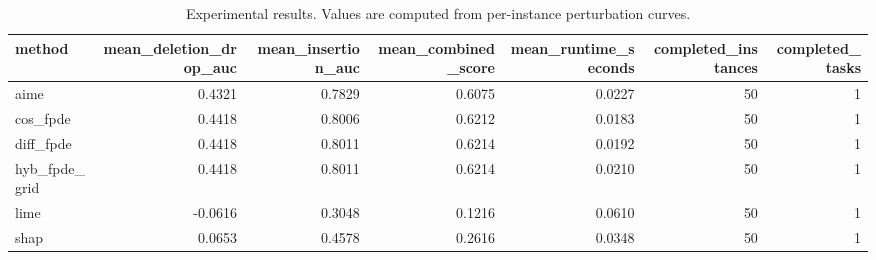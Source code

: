 \begin{table}[t]
\caption{Experimental results. Values are computed from per-instance perturbation curves.}
\label{tab:main_results_computed}
\centering
\begin{tabular}{lrrrrrr}
\toprule
method & mean\_deletion\_drop\_auc & mean\_insertion\_auc & mean\_combined\_score & mean\_runtime\_seconds & completed\_instances & completed\_tasks \\
\midrule
aime & 0.4321 & 0.7829 & 0.6075 & 0.0227 & 50 & 1 \\
cos\_fpde & 0.4418 & 0.8006 & 0.6212 & 0.0183 & 50 & 1 \\
diff\_fpde & 0.4418 & 0.8011 & 0.6214 & 0.0192 & 50 & 1 \\
hyb\_fpde\_grid & 0.4418 & 0.8011 & 0.6214 & 0.0210 & 50 & 1 \\
lime & -0.0616 & 0.3048 & 0.1216 & 0.0610 & 50 & 1 \\
shap & 0.0653 & 0.4578 & 0.2616 & 0.0348 & 50 & 1 \\
\bottomrule
\end{tabular}

\end{table}
